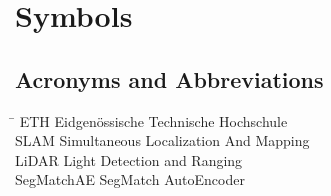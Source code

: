 \chapter*{Symbols}
\label{sec:symbols}

% 
% 
% 
\section*{Acronyms and Abbreviations}
\begin{tabbing}
 \hspace*{2.6cm}  \= \kill
 ETH \> Eidgenössische Technische Hochschule \\[0.5ex]
 SLAM \> Simultaneous Localization And Mapping \\[0.5ex]
 LiDAR \> Light Detection and Ranging \\[0.5ex]
 SegMatchAE \> SegMatch AutoEncoder \\[0.5ex]
\end{tabbing}
